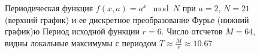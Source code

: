\begin{figure}
\centering




\caption{Периодическая функция
  $f\left(x, a\right) = a^x \mod{N}$ при $a=2$, $N = 21$ (верхний
  график) и ее дискретное преобразование Фурье (нижний график)ю
  Период исходной функции $r = 6$. Число отсчетов $M = 64$, 
  видны локальные максимумы с периодом $T \approx \frac{M}{r} \approx 10.67$}
\label{picAddFourierFourier}
\end{figure}
